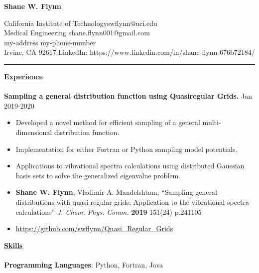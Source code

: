 \documentclass[letterpaper]{article}
\def\name{Shane W. Flynn}
\begin{document}
\centerline{\huge \textbf{\name}}
\vspace{0.1in}
California Institute of Technology\hfill swflynn@uci.edu\\
Medical Engineering \hfill shane.flynn001@gmail.com \\
my-address \hfill my-phone-number\\
Irvine, CA 92617 \hfill LinkedIn: https://www.linkedin.com/in/shane-flynn-676b72184/\\
\hrule
{\large \textbf{\underline{Experience}}}\\
\vspace{-0.1in}\\
\textbf{Sampling a general distribution function using Quasiregular Grids.}
\hfill Jan 2019-2020
\begin{itemize}
    \item Developed a novel method for efficient sampling of a general
    multi-dimensional distribution function.
    \item Implementation for either Fortran or Python sampling model potentials.
    \item Applications to vibrational spectra calculations using distributed
    Gaussian basis sets to solve the generalized eigenvalue problem.
    \item \textbf{Shane W. Flynn}, Vladimir A. Mandelshtam,
          ``Sampling general distributions with quasi-regular grids: Application
           to the vibrational spectra calculations''
           \textit{J. Chem. Phys. Comm.} \textbf{2019} 151(24) p.241105
    \item \url{https://github.com/swflynn/Quasi_Regular_Grids}
    \end{itemize}
{\large \textbf{\underline{Skills}}}\\
\vspace{-0.1in}\\
\textbf{Programming Languages}: Python, Fortran, Java\\
\end{document}
